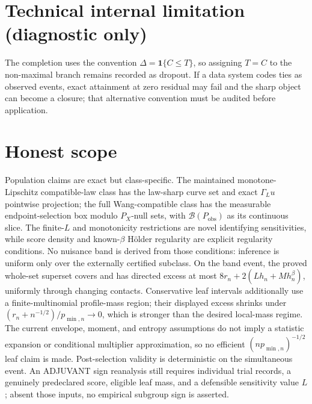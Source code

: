 \documentclass{article}
\begin{document}
\section*{Technical internal limitation (diagnostic only)}

The completion uses the convention \(\Delta=\mathbf 1\{C\le T\}\), so assigning \(T=C\) to the non-maximal branch remains recorded as dropout. If a data system codes ties as observed events, exact attainment at zero residual may fail and the sharp object can become a closure; that alternative convention must be audited before application.

\section{Honest scope}

Population claims are exact but class-specific. The maintained monotone-Lipschitz compatible-law class has the law-sharp curve set and exact \(\Gamma_Lu\) pointwise projection; the full Wang-compatible class has the measurable endpoint-selection box modulo \(P_X\)-null sets, with \(\mathcal B(P_{\mathrm{obs}})\) as its continuous slice. The finite-\(L\) and monotonicity restrictions are novel identifying sensitivities, while score density and known-\(\beta\) Hölder regularity are explicit regularity conditions. No nuisance band is derived from those conditions: inference is uniform only over the externally certified subclass. On the band event, the proved whole-set superset covers and has directed excess at most \(8r_n+2(Lh_n+Mh_n^\beta)\), uniformly through changing contacts. Conservative leaf intervals additionally use a finite-multinomial profile-mass region; their displayed excess shrinks under \((r_n+n^{-1/2})/p_{\min,n}\to0\), which is stronger than the desired local-mass regime. The current envelope, moment, and entropy assumptions do not imply a statistic expansion or conditional multiplier approximation, so no efficient \((np_{\min,n})^{-1/2}\) leaf claim is made. Post-selection validity is deterministic on the simultaneous event. An ADJUVANT sign reanalysis still requires individual trial records, a genuinely predeclared score, eligible leaf mass, and a defensible sensitivity value \(L\); absent those inputs, no empirical subgroup sign is asserted.
\end{document}
